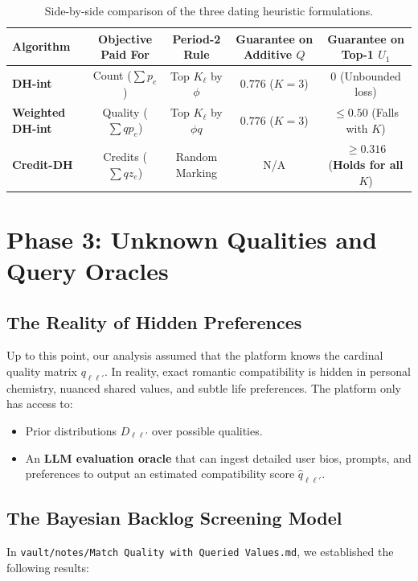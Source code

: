 \documentclass[11pt,letterpaper]{article}
\theoremstyle{definition}
\theoremstyle{plain}
\theoremstyle{remark}
\begin{document}
\begin{table}[ht]
\centering
\begin{tabular}{@{}lcccc@{}}
\toprule
Algorithm & Objective Paid For & Period-2 Rule & Guarantee on Additive $Q$ & Guarantee on Top-1 $U_1$ \\
\midrule
\textbf{DH-int} & Count ($\sum p_e$) & Top $K_\ell$ by $\phi$ & $0.776$ ($K=3$) & $0$ (Unbounded loss) \\
\textbf{Weighted DH-int} & Quality ($\sum q p_e$) & Top $K_\ell$ by $\phi q$ & $0.776$ ($K=3$) & $\le 0.50$ (Falls with $K$) \\
\textbf{Credit-DH} & Credits ($\sum q z_e$) & Random Marking & N/A & $\mathbf{\ge 0.316}$ (\textbf{Holds for all $K$}) \\
\bottomrule
\end{tabular}
\caption{Side-by-side comparison of the three dating heuristic formulations.}
\label{tab:dh_comparison}
\end{table}

\newpage
\section{Phase 3: Unknown Qualities and Query Oracles}
\label{sec:queries}

\subsection{The Reality of Hidden Preferences}
Up to this point, our analysis assumed that the platform knows the cardinal quality matrix $q_{\ell\ell'}$. In reality, exact romantic compatibility is hidden in personal chemistry, nuanced shared values, and subtle life preferences. The platform only has access to:
\begin{itemize}[leftmargin=2em]
    \item Prior distributions $D_{\ell\ell'}$ over possible qualities.
    \item An \textbf{LLM evaluation oracle} that can ingest detailed user bios, prompts, and preferences to output an estimated compatibility score $\hat{q}_{\ell\ell'}$.
\end{itemize}

\subsection{The Bayesian Backlog Screening Model}
In \texttt{vault/notes/Match Quality with Queried Values.md}, we established the following results:
\end{document}
